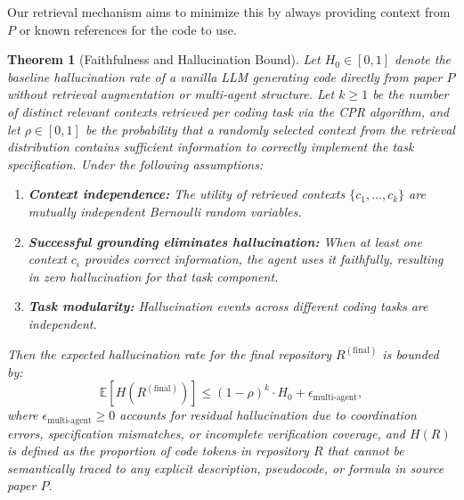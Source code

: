 \documentclass{ieeeaccess}
\newtheorem{theorem}{Theorem}
\begin{document}
Our retrieval mechanism aims to minimize this by always providing context from $P$ or known references for the code to use.

\begin{theorem}[Faithfulness and Hallucination Bound]
\label{thm:faithfulness}
Let \(H_0 \in [0,1]\) denote the baseline hallucination rate of a vanilla LLM generating code directly from paper \(P\) without retrieval augmentation or multi-agent structure. Let \(k \geq 1\) be the number of distinct relevant contexts retrieved per coding task via the CPR algorithm, and let \(\rho \in [0,1]\) be the probability that a randomly selected context from the retrieval distribution contains sufficient information to correctly implement the task specification. Under the following assumptions:
\begin{enumerate}
\item \textbf{Context independence:} The utility of retrieved contexts \(\{c_1, \ldots, c_k\}\) are mutually independent Bernoulli random variables.
\item \textbf{Successful grounding eliminates hallucination:} When at least one context \(c_i\) provides correct information, the agent uses it faithfully, resulting in zero hallucination for that task component.
\item \textbf{Task modularity:} Hallucination events across different coding tasks are independent.
\end{enumerate}
Then the expected hallucination rate for the final repository \(R^{(\text{final})}\) is bounded by:
\begin{equation}
\mathbb{E}[H(R^{(\text{final})})] \leq (1-\rho)^k \cdot H_0 + \epsilon_{\text{multi-agent}},
\label{eq:faithfulness-bound}
\end{equation}
where \(\epsilon_{\text{multi-agent}} \geq 0\) accounts for residual hallucination due to coordination errors, specification mismatches, or incomplete verification coverage, and \(H(R)\) is defined as the proportion of code tokens in repository \(R\) that cannot be semantically traced to any explicit description, pseudocode, or formula in source paper \(P\).
\end{theorem}
\end{document}

